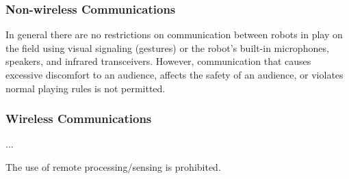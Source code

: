 \subsubsection{Non-wireless Communications}
\label{sec:acoustic}

In general there are no restrictions on communication between robots in play on the field using visual signaling (\eg gestures) or the robot's built-in microphones, speakers, and infrared transceivers.
However, communication that causes excessive discomfort to an audience, affects the safety of an audience, or violates normal playing rules is not permitted.

\subsubsection{Wireless Communications}
\label{sec:wireless}

... 

The use of remote processing/sensing is prohibited.